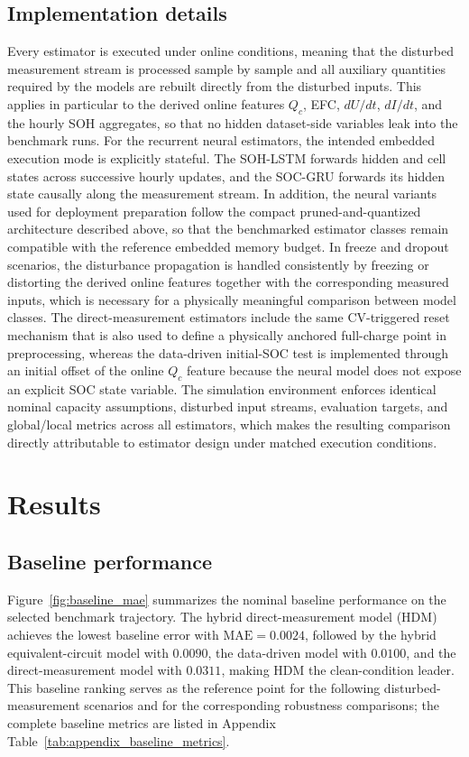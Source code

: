\documentclass[review]{elsarticle}
\begin{document}
\subsection{Implementation details}
Every estimator is executed under online conditions, meaning that the disturbed measurement stream is processed sample by sample and all auxiliary quantities required by the models are rebuilt directly from the disturbed inputs. This applies in particular to the derived online features $Q_c$, EFC, $dU/dt$, $dI/dt$, and the hourly SOH aggregates, so that no hidden dataset-side variables leak into the benchmark runs. For the recurrent neural estimators, the intended embedded execution mode is explicitly stateful. The SOH-LSTM forwards hidden and cell states across successive hourly updates, and the SOC-GRU forwards its hidden state causally along the measurement stream. In addition, the neural variants used for deployment preparation follow the compact pruned-and-quantized architecture described above, so that the benchmarked estimator classes remain compatible with the reference embedded memory budget. In freeze and dropout scenarios, the disturbance propagation is handled consistently by freezing or distorting the derived online features together with the corresponding measured inputs, which is necessary for a physically meaningful comparison between model classes. The direct-measurement estimators include the same CV-triggered reset mechanism that is also used to define a physically anchored full-charge point in preprocessing, whereas the data-driven initial-SOC test is implemented through an initial offset of the online $Q_c$ feature because the neural model does not expose an explicit SOC state variable. The simulation environment enforces identical nominal capacity assumptions, disturbed input streams, evaluation targets, and global/local metrics across all estimators, which makes the resulting comparison directly attributable to estimator design under matched execution conditions.

\section{Results}
\subsection{Baseline performance}
Figure~\ref{fig:baseline_mae} summarizes the nominal baseline performance on the selected benchmark trajectory. The hybrid direct-measurement model (HDM) achieves the lowest baseline error with $\mathrm{MAE}=0.0024$, followed by the hybrid equivalent-circuit model with $0.0090$, the data-driven model with $0.0100$, and the direct-measurement model with $0.0311$, making HDM the clean-condition leader. This baseline ranking serves as the reference point for the following disturbed-measurement scenarios and for the corresponding robustness comparisons; the complete baseline metrics are listed in Appendix Table~\ref{tab:appendix_baseline_metrics}.
\end{document}
